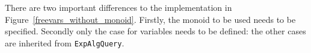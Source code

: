 There are two important differences to the implementation in
Figure~\ref{freevars_without_monoid}.  Firstly, the monoid to be used
needs to be specified.  Secondly only the case for variables needs to
be defined: the other cases are inherited from
\lstinline{ExpAlgQuery}.

\begin{comment}
\haoyuan{Begin: client code.}
Now one can do some experiments with this approach. First comes an example of the expression built up like this:


The method \lstinline{genExp()} just gives the expression \lstinline{x + (y + 2)}. And then an instance of \lstinline{FreeVars} is passed to \lstinline{genExp()} to get the names of free variables.
The result given by the following code is \lstinline{[x, y]}, which is a set of strings.


\haoyuan{End: client code. x + (y + 2) and [x, y] in code style?}
\end{comment}



\begin{comment}
But the result for an expression can only be a null list based on the
monoid. Thus in the freeVars query, furthermore, we expect the
variables to store their names into a list, and by using the monoid,
freeVars can be implemented. See Fig.~\ref{freevars_with_monoid}.


When the interface \lstinline{FreeVarsExpAlg} is used, an object of
the \lstinline{FreeVarsMonoid} is then created. As we can see, it is
needless for a user to write an exclusive traversal fully for a data
structure. Nothing but a monoid is required together with a few
methods being overwritten. And furthermore, a monoid can usually be
shared among query algebras with the same data type.
\end{comment}

